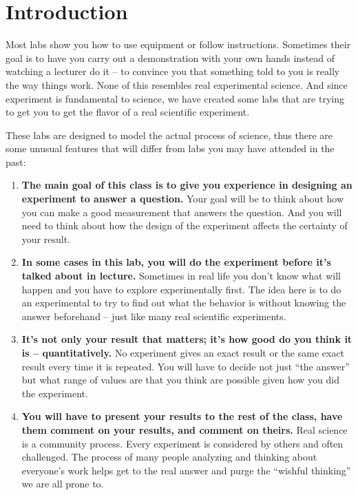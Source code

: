 \clearpage
\setcounter{page}{1}

\chapter*{Introduction}
\thispagestyle{fancy}
Most labs show you how to use equipment or follow instructions.
Sometimes their goal is to have you carry out a demonstration with your own hands instead of watching a lecturer do it – to convince you that something told to you is really the way things work.
None of this resembles real experimental science.
And since experiment is fundamental to science, we have created some labs that are trying to get you to get the flavor of a real scientific experiment. \par
These labs are designed to model the actual process of science, thus there are some unusual features that will differ from labs you may have attended in the past:
\begin{enumerate}
\item \textbf{The main goal of this class is to give you experience in designing an
experiment to answer a question.} Your goal will be to think about how you can
make a good measurement that answers the question. And you will need to think
about how the design of the experiment affects the certainty of your result.
\item \textbf{In some cases in this lab, you will do the experiment before it’s talked about
in lecture.} Sometimes in real life you don’t know what will happen and you have to
explore experimentally first. The idea here is to do an experimental to try to find out
what the behavior is without knowing the answer beforehand – just like many real
scientific experiments.
\item \textbf{It's not only your result that matters; it’s how good do you think it is –
quantitatively.} No experiment gives an exact result or the same exact result every
time it is repeated. You will have to decide not just ``the answer'' but what range of
values are that you think are possible given how you did the experiment.
\item \textbf{You will have to present your results to the rest of the class, have them
comment on your results, and comment on theirs.} Real science is a community
process. Every experiment is considered by others and often challenged. The process
of many people analyzing and thinking about everyone's work helps get to the real
answer and purge the ``wishful thinking'' we are all prone to.
\end{enumerate}

